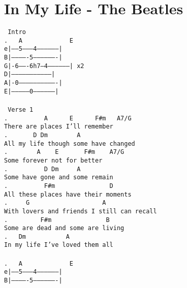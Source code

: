 \newpage
\section{In My Life - The Beatles}
\label{In My Life - The Beatles}
\texttt{\lbrack\ Intro\rbrack\\
. \ \ A\ \ \ \ \ \ \ \ \ \ \ \ \ E\\
e|-----5---------4-----------------|\\
B|-------------5-------------------|\\
G|-6-------6h7---4-----------------|\ x2\\
D|---------------------------------|\\
A|-0-------------------------------|\\
E|---------------0-----------------|\\
\\
\lbrack\ Verse\ 1\rbrack\\
. \ \ \ \ \ \ \ \ \ A\ \ \ \ \ \ E\ \ \ \ \ \ F\#m\ \ \ A7/G\\
There\ are\ places\ I'll\ remember\\
. \ \ \ \ \ \ D\ Dm\ \ \ \ \ \ \ \ A\\
All\ my\ life\ though\ some\ have\ changed\\
. \ \ \ \ \ \ \ A\ \ \ \ E\ \ \ \ \ \ \ F\#m\ \ \ \ A7/G\\
Some\ forever\ not\ for\ better\\
. \ \ \ \ \ \ \ \ \ D\ Dm\ \ \ \ \ A\\
Some\ have\ gone\ and\ some\ remain\\
. \ \ \ \ \ \ \ \ \ F\#m\ \ \ \ \ \ \ \ \ \ \ \ \ \ \ D\\
All\ these\ places\ have\ their\ moments\\
. \ \ \ \ G\ \ \ \ \ \ \ \ \ \ \ \ \ \ \ \ \ \ \ \ A\\
With\ lovers\ and\ friends\ I\ still\ can\ recall\\
. \ \ \ \ \ \ \ \ F\#m\ \ \ \ \ \ \ \ \ \ \ \ \ \ \ B\\
Some\ are\ dead\ and\ some\ are\ living\\
. \ \ Dm\ \ \ \ \ \ \ \ \ \ \ A\\
In\ my\ life\ I've\ loved\ them\ all\\
\\
. \ \ A\ \ \ \ \ \ \ \ \ \ \ \ \ E\\
e|-----5---------4-----------------|\\
B|-------------5-------------------|\\
}

